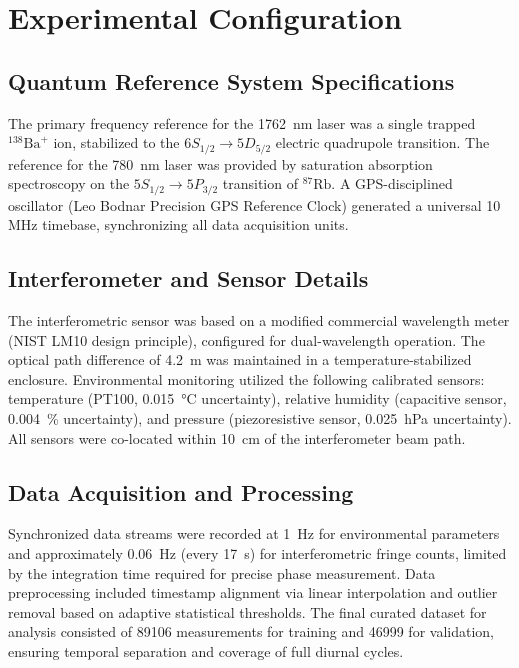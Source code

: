 \documentclass[aps,pra,reprint,groupedaddress,twocolumn,superscriptaddress]{revtex4-2}
\begin{document}
\appendix

\section{Experimental Configuration}
\label{app:experimental}

\subsection{Quantum Reference System Specifications}

The primary frequency reference for the \SI{1762}{\nano\meter} laser was a single trapped \(^{138}\text{Ba}^+\) ion, stabilized to the \(6S_{1/2} \rightarrow 5D_{5/2}\) electric quadrupole transition. The reference for the \SI{780}{\nano\meter} laser was provided by saturation absorption spectroscopy on the \(5S_{1/2} \rightarrow 5P_{3/2}\) transition of \(^{87}\text{Rb}\). A GPS-disciplined oscillator (Leo Bodnar Precision GPS Reference Clock) generated a universal 10 MHz timebase, synchronizing all data acquisition units.

\subsection{Interferometer and Sensor Details}

The interferometric sensor was based on a modified commercial wavelength meter (NIST LM10 design principle), configured for dual-wavelength operation. The optical path difference of \SI{4.2}{\meter} was maintained in a temperature-stabilized enclosure. Environmental monitoring utilized the following calibrated sensors: temperature (PT100, \SI{0.015}{\celsius} uncertainty), relative humidity (capacitive sensor, \SI{0.004}{\percent} uncertainty), and pressure (piezoresistive sensor, \SI{0.025}{\hecto\pascal} uncertainty). All sensors were co-located within \SI{10}{\centi\meter} of the interferometer beam path.

\subsection{Data Acquisition and Processing}

Synchronized data streams were recorded at \SI{1}{\hertz} for environmental parameters and approximately \SI{0.06}{\hertz} (every \SI{17}{\second}) for interferometric fringe counts, limited by the integration time required for precise phase measurement. Data preprocessing included timestamp alignment via linear interpolation and outlier removal based on adaptive statistical thresholds. The final curated dataset for analysis consisted of \num{89106} measurements for training and \num{46999} for validation, ensuring temporal separation and coverage of full diurnal cycles.
\end{document}
